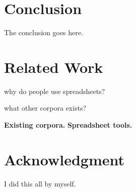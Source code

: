 \documentclass[conference]{IEEEtran}
\begin{document}
\section{Conclusion}
The conclusion goes here.

\section{Related Work}

why do people use spreadsheets?

what other corpora exists?


\textbf{Existing corpora.}
\textbf{Spreadsheet tools.}





\section*{Acknowledgment}

I did this all by myself.







\raggedright




\end{document}
